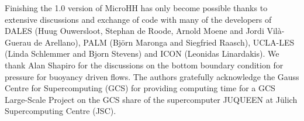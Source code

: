 \documentclass[gmd,manuscript]{copernicus}
\begin{document}
\begin{acknowledgements}
Finishing the 1.0 version of MicroHH has only become possible thanks to extensive discussions and exchange of code with many of the developers of DALES (Huug Ouwersloot, Stephan de Roode, Arnold Moene and Jordi Vil\`{a}-Guerau de Arellano), PALM (Bj\"{o}rn Maronga and Siegfried Raasch), UCLA-LES (Linda Schlemmer and Bjorn Stevens) and ICON (Leonidas Linardakis). We thank Alan Shapiro for the discussions on the bottom boundary condition for pressure for buoyancy driven flows. The authors gratefully acknowledge the Gauss Centre for Supercomputing (GCS) for providing computing time for a GCS Large-Scale Project on the GCS share of the supercomputer JUQUEEN at J\"{u}lich Supercomputing Centre (JSC). 
\end{acknowledgements}



%
\end{document}
